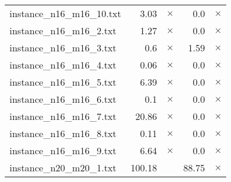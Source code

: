 \documentclass{article}
\begin{document}
\begin{center}
\begin{tabular}{lrrrr}
instance\_n16\_m16\_10.txt & 3.03 & 
$\times$
 & 0.0 & 
$\times$
\\
instance\_n16\_m16\_2.txt & 1.27 & 
$\times$
 & 0.0 & 
$\times$
\\
instance\_n16\_m16\_3.txt & 0.6 & 
$\times$
 & 1.59 & 
$\times$
\\
instance\_n16\_m16\_4.txt & 0.06 & 
$\times$
 & 0.0 & 
$\times$
\\
instance\_n16\_m16\_5.txt & 6.39 & 
$\times$
 & 0.0 & 
$\times$
\\
instance\_n16\_m16\_6.txt & 0.1 & 
$\times$
 & 0.0 & 
$\times$
\\
instance\_n16\_m16\_7.txt & 20.86 & 
$\times$
 & 0.0 & 
$\times$
\\
instance\_n16\_m16\_8.txt & 0.11 & 
$\times$
 & 0.0 & 
$\times$
\\
instance\_n16\_m16\_9.txt & 6.64 & 
$\times$
 & 0.0 & 
$\times$
\\
instance\_n20\_m20\_1.txt & 100.18 & 
 & 88.75 & 
$\times$
\\
\hline\end{tabular}
\end{center}
\end{document}
